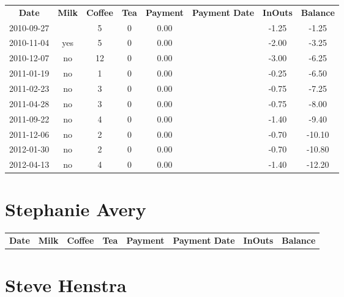 \begin{center}
\begin{tabular}{cccccccc}
\textbf{Date} & \textbf{Milk} & \textbf{Coffee} & \textbf{Tea} & \textbf{Payment} & \textbf{Payment Date} & \textbf{InOuts} & \textbf{Balance} \\
2010-09-27 &  &  5 & 0 & 0.00 &  & -1.25 &  -1.25\\ 
2010-11-04 & yes &  5 & 0 & 0.00 &  & -2.00 &  -3.25\\ 
2010-12-07 & no & 12 & 0 & 0.00 &  & -3.00 &  -6.25\\ 
2011-01-19 & no &  1 & 0 & 0.00 &  & -0.25 &  -6.50\\ 
2011-02-23 & no &  3 & 0 & 0.00 &  & -0.75 &  -7.25\\ 
2011-04-28 & no &  3 & 0 & 0.00 &  & -0.75 &  -8.00\\ 
2011-09-22 & no &  4 & 0 & 0.00 &  & -1.40 &  -9.40\\ 
2011-12-06 & no &  2 & 0 & 0.00 &  & -0.70 & -10.10\\ 
2012-01-30 & no &  2 & 0 & 0.00 &  & -0.70 & -10.80\\ 
2012-04-13 & no &  4 & 0 & 0.00 &  & -1.40 & -12.20
\end{tabular}
\end{center}

\section{Stephanie Avery}

\begin{center}
\begin{tabular}{cccccccc}
\textbf{Date} & \textbf{Milk} & \textbf{Coffee} & \textbf{Tea} & \textbf{Payment} & \textbf{Payment Date} & \textbf{InOuts} & \textbf{Balance} \\

\end{tabular}
\end{center}

\section{Steve Henstra}

